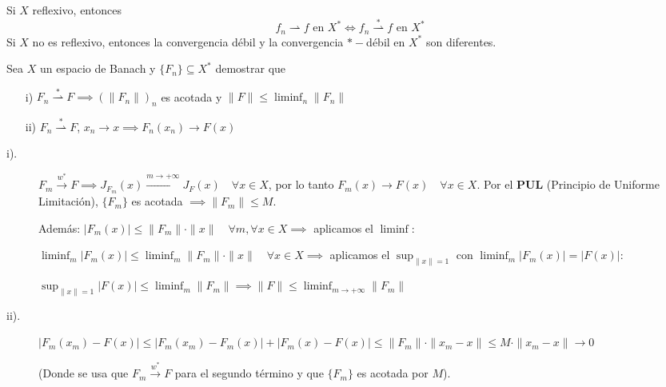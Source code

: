 \begin{observacion}
    Si $X$ reflexivo, entonces
    \begin{equation*}
        f_n \rightharpoonup f \text{ en } X^* \iff f_n \overset{*}{\rightharpoonup} f \text{ en } X^*
    \end{equation*}
    Si $X$ no es reflexivo, entonces la convergencia débil y la convergencia $*-$débil en $X^*$ son diferentes.
\end{observacion}

\begin{ejercicio}
    Sea $X$ un espacio de Banach y $\{F_n\} \subseteq X^*$ demostrar que
    \begin{itemize}
        \item [i)] $F_n \overset{*}{\rightharpoonup}F \implies (\|F_n\|)_n$ es acotada y $\|F\| \le \liminf_n \|F_n\|$
        \item [ii)] $F_n \overset{*}{\rightharpoonup} F$, $x_n \to x \implies F_n(x_n) \to F(x)$
    \end{itemize} 
    \begin{description}
        \item[i).] $F_m \xrightarrow{w^*} F \implies J_{F_m}(x) \xrightarrow{m \to +\infty} J_F(x) \quad \forall x \in X$, por lo tanto $F_m(x) \to F(x) \quad \forall x \in X$. Por el \textbf{PUL} (Principio de Uniforme Limitación), $\{F_m\}$ es acotada $\implies \|F_m\| \le M$.
    
        Además: $|F_m(x)| \le \|F_m\| \cdot \|x\| \quad \forall m, \forall x \in X \implies$ aplicamos el $\liminf$:
        
        $\liminf_m |F_m(x)| \le \liminf_m \|F_m\| \cdot \|x\| \quad \forall x \in X \implies$ aplicamos el $\sup_{\|x\|=1}$ con $\liminf_m |F_m(x)| = |F(x)|$:
        
        $\sup_{\|x\|=1} |F(x)| \le \liminf_m \|F_m\| \implies \|F\| \le \liminf_{m \to +\infty} \|F_m\|$

        \item[ii).] $|F_m(x_m) - F(x)| \le |F_m(x_m) - F_m(x)| + |F_m(x) - F(x)| \le \|F_m\| \cdot \|x_m - x\| \le M \cdot \|x_m - x\| \longrightarrow 0$
    
        (Donde se usa que $F_m \xrightarrow{w^*} F$ para el segundo término y que $\{F_m\}$ es acotada por $M$).
        
    \end{description}

\end{ejercicio}

